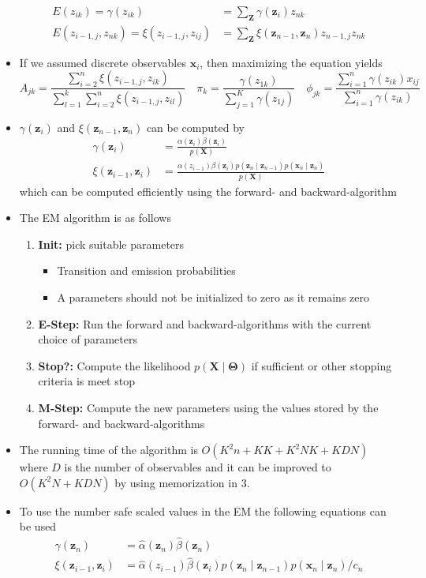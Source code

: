 \documentclass[a4, english]{article}
\begin{document}
\begin{itemize}
  \begin{align*}
                    E(z_{ik}) = \gamma(z_{ik}) &= \sum_{\pmb Z} \gamma (\pmb z_i) z_{nk} \\
    E(z_{i-1,j}, z_{nk}) = \xi(z_{i-1,j}, z_{ij}) &= \sum_{\pmb Z} \xi(\pmb z_{n-1}, \pmb z_n) z_{n-1,j} z_{nk}
  \end{align*}
  \item If we assumed discrete observables $\pmb x_i$, then maximizing the equation yields 
  \begin{equation*}
    A_{jk} = \frac{\sum_{i=2}^n \xi(z_{i-1,j},z_{ik})}{\sum_{l=1}^k\sum_{i=2}^n \xi(z_{i-1,j},z_{il})}  \quad
    \pi_k = \frac{\gamma(z_{1k})}{\sum_{j=1}^K\gamma(z_{1j})} \quad
    \phi_{jk}=\frac{\sum_{i=1}^n \gamma(z_{ik})x_{ij}}{\sum_{i=1}^n \gamma(z_{ik})} 
  \end{equation*}
  \item $\gamma(\pmb z_i)$ and $\xi(\pmb z_{n-1}, \pmb z_n)$ can be computed by
  \begin{align*}
             \gamma(\pmb z_i) &= \frac{\alpha(\pmb z_i) \beta(\pmb z_i)}{p(\pmb X)} \\
   \xi(\pmb z_{i-1}, \pmb z_i) &= \frac{\alpha(z_{i-1}) \beta(\pmb z_i) p(\pmb z_n \mid \pmb z_{n-1}) p(\pmb x_n \mid \pmb z_n)}{p(\pmb X)}
  \end{align*}
  which can be computed efficiently using the forward- and backward-algorithm
  \item The EM algorithm is as follows
  \begin{enumerate}
  	\item \textbf{Init:} pick suitable parameters
    \begin{itemize}
    	\item Transition and emission probabilities
      \item A parameters should not be initialized to zero as it remains zero 
    \end{itemize}
    \item \textbf{E-Step:} Run the forward and backward-algorithms with the current choice of parameters
    \item \textbf{Stop?:} Compute the likelihood $p(\pmb X \mid \pmb \Theta)$ if sufficient or other stopping criteria is meet stop
    \item \textbf{M-Step:} Compute the new parameters using the values stored by the forward- and backward-algorithms
  \end{enumerate}
  \item The running time of the algorithm is $O(K^2n + KK + K^2NK + KDN)$ where $D$ is the number of observables and it can be improved to $O(K^2N + KDN)$ by using memorization in 3.  
  \item To use the number safe scaled values in the EM the following equations can be used
  \begin{align*}
             \gamma(\pmb z_n) &= \hat \alpha (\pmb z_n) \hat \beta(\pmb z_n) \\
   \xi(\pmb z_{i-1}, \pmb z_i) &= \hat \alpha(z_{i-1}) \hat \beta(\pmb z_i) p(\pmb z_n \mid \pmb z_{n-1}) p(\pmb x_n \mid \pmb z_n)/c_n
  \end{align*}
\end{itemize}
\end{document}
